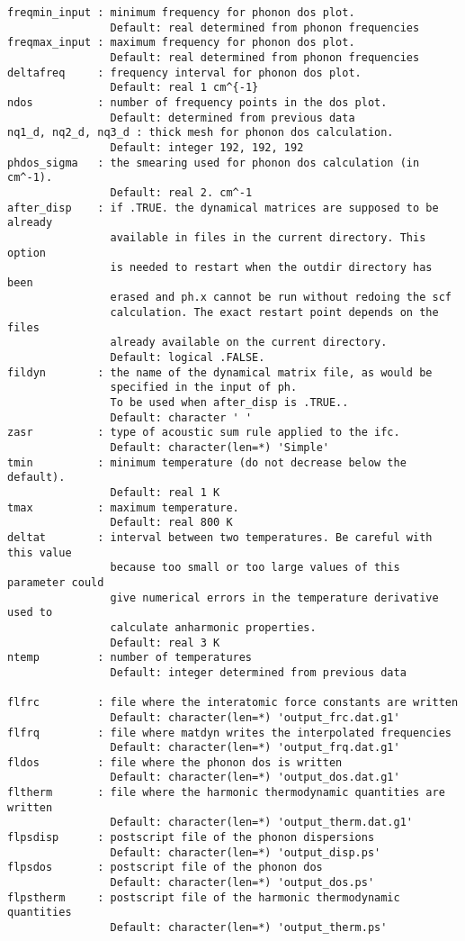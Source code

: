 \documentclass[12pt,a4paper]{article}
\begin{document}
\begin{verbatim}
freqmin_input : minimum frequency for phonon dos plot.
                Default: real determined from phonon frequencies
freqmax_input : maximum frequency for phonon dos plot.
                Default: real determined from phonon frequencies
deltafreq     : frequency interval for phonon dos plot.
                Default: real 1 cm^{-1}
ndos          : number of frequency points in the dos plot.
                Default: determined from previous data
nq1_d, nq2_d, nq3_d : thick mesh for phonon dos calculation.
                Default: integer 192, 192, 192
phdos_sigma   : the smearing used for phonon dos calculation (in cm^-1).
                Default: real 2. cm^-1
after_disp    : if .TRUE. the dynamical matrices are supposed to be already
                available in files in the current directory. This option
                is needed to restart when the outdir directory has been
                erased and ph.x cannot be run without redoing the scf 
                calculation. The exact restart point depends on the files
                already available on the current directory.
                Default: logical .FALSE.
fildyn        : the name of the dynamical matrix file, as would be 
                specified in the input of ph. 
                To be used when after_disp is .TRUE.. 
                Default: character ' '
zasr          : type of acoustic sum rule applied to the ifc.
                Default: character(len=*) 'Simple'
tmin          : minimum temperature (do not decrease below the default).
                Default: real 1 K
tmax          : maximum temperature.
                Default: real 800 K
deltat        : interval between two temperatures. Be careful with this value
                because too small or too large values of this parameter could 
                give numerical errors in the temperature derivative used to 
                calculate anharmonic properties.
                Default: real 3 K
ntemp         : number of temperatures
                Default: integer determined from previous data

flfrc         : file where the interatomic force constants are written
                Default: character(len=*) 'output_frc.dat.g1'
flfrq         : file where matdyn writes the interpolated frequencies
                Default: character(len=*) 'output_frq.dat.g1'
fldos         : file where the phonon dos is written
                Default: character(len=*) 'output_dos.dat.g1'
fltherm       : file where the harmonic thermodynamic quantities are written
                Default: character(len=*) 'output_therm.dat.g1'
flpsdisp      : postscript file of the phonon dispersions
                Default: character(len=*) 'output_disp.ps'
flpsdos       : postscript file of the phonon dos
                Default: character(len=*) 'output_dos.ps'
flpstherm     : postscript file of the harmonic thermodynamic quantities
                Default: character(len=*) 'output_therm.ps'
\end{verbatim}
\end{document}
